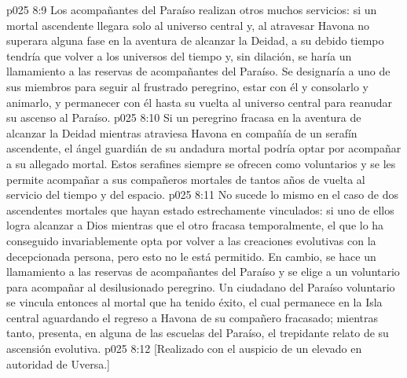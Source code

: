 \vs p025 8:9 \pc Los acompañantes del Paraíso realizan otros muchos servicios: si un mortal ascendente llegara solo al universo central y, al atravesar Havona no superara alguna fase en la aventura de alcanzar la Deidad, a su debido tiempo tendría que volver a los universos del tiempo y, sin dilación, se haría un llamamiento a las reservas de acompañantes del Paraíso. Se designaría a uno de sus miembros para seguir al frustrado peregrino, estar con él y consolarlo y animarlo, y permanecer con él hasta su vuelta al universo central para reanudar su ascenso al Paraíso.
\vs p025 8:10 Si un peregrino fracasa en la aventura de alcanzar la Deidad mientras atraviesa Havona en compañía de un serafín ascendente, el ángel guardián de su andadura mortal podría optar por acompañar a su allegado mortal. Estos serafines siempre se ofrecen como voluntarios y se les permite acompañar a sus compañeros mortales de tantos años de vuelta al servicio del tiempo y del espacio.
\vs p025 8:11 No sucede lo mismo en el caso de dos ascendentes mortales que hayan estado estrechamente vinculados: si uno de ellos logra alcanzar a Dios mientras que el otro fracasa temporalmente, el que lo ha conseguido invariablemente opta por volver a las creaciones evolutivas con la decepcionada persona, pero esto no le está permitido. En cambio, se hace un llamamiento a las reservas de acompañantes del Paraíso y se elige a un voluntario para acompañar al desilusionado peregrino. Un ciudadano del Paraíso voluntario se vincula entonces al mortal que ha tenido éxito, el cual permanece en la Isla central aguardando el regreso a Havona de su compañero fracasado; mientras tanto, presenta, en alguna de las escuelas del Paraíso, el trepidante relato de su ascensión evolutiva.
\vsetoff
\vs p025 8:12 [Realizado con el auspicio de un elevado en autoridad de Uversa.]
